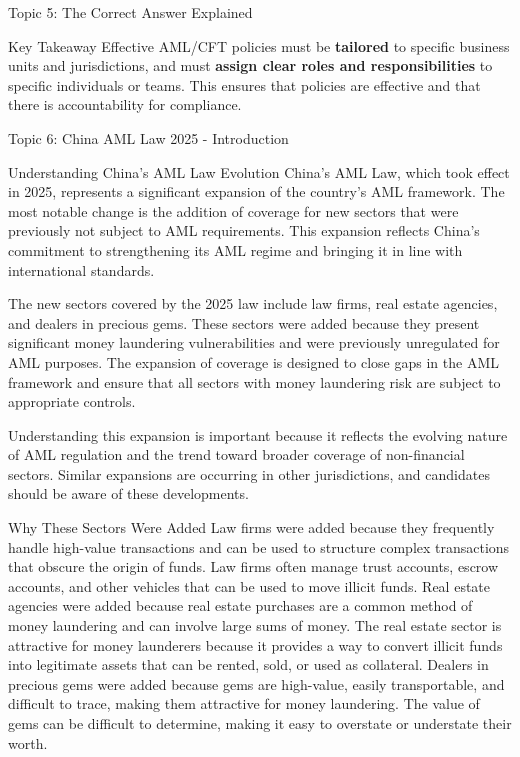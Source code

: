 \documentclass[8pt]{beamer}  %
\begin{document}
\begin{frame}{Topic 5: The Correct Answer Explained}
		\begin{alertblock}{Key Takeaway}
			Effective AML/CFT policies must be \textbf{tailored} to specific business units and jurisdictions, and must \textbf{assign clear roles and responsibilities} to specific individuals or teams. This ensures that policies are effective and that there is accountability for compliance.
		\end{alertblock}
	\end{frame}
	
	\begin{frame}{Topic 6: China AML Law 2025 - Introduction}
		\begin{block}{\large Understanding China's AML Law Evolution}
			China's AML Law, which took effect in 2025, represents a significant expansion of the country's AML framework. The most notable change is the addition of coverage for new sectors that were previously not subject to AML requirements. This expansion reflects China's commitment to strengthening its AML regime and bringing it in line with international standards.
			
			The new sectors covered by the 2025 law include law firms, real estate agencies, and dealers in precious gems. These sectors were added because they present significant money laundering vulnerabilities and were previously unregulated for AML purposes. The expansion of coverage is designed to close gaps in the AML framework and ensure that all sectors with money laundering risk are subject to appropriate controls.
			
			Understanding this expansion is important because it reflects the evolving nature of AML regulation and the trend toward broader coverage of non-financial sectors. Similar expansions are occurring in other jurisdictions, and candidates should be aware of these developments.
		\end{block}
		
		\vspace{0.2cm}
		\begin{block}{\large Why These Sectors Were Added}
			Law firms were added because they frequently handle high-value transactions and can be used to structure complex transactions that obscure the origin of funds. Law firms often manage trust accounts, escrow accounts, and other vehicles that can be used to move illicit funds. Real estate agencies were added because real estate purchases are a common method of money laundering and can involve large sums of money. The real estate sector is attractive for money launderers because it provides a way to convert illicit funds into legitimate assets that can be rented, sold, or used as collateral. Dealers in precious gems were added because gems are high-value, easily transportable, and difficult to trace, making them attractive for money laundering. The value of gems can be difficult to determine, making it easy to overstate or understate their worth.
		\end{block}
	\end{frame}
	
\end{document}
